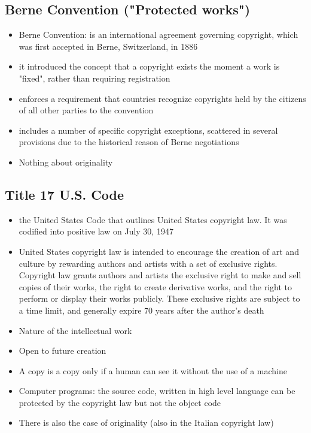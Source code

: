 \documentclass{article}
\begin{document}
\subsection{Berne Convention ("Protected works")}
\begin{itemize}
\item Berne Convention: is an international agreement governing copyright, which was first accepted in Berne, Switzerland, in 1886
\item it introduced the concept that a copyright exists the moment a work is "fixed", rather than requiring registration
\item enforces a requirement that countries recognize copyrights held by the citizens of all other parties to the convention
\item includes a number of specific copyright exceptions, scattered in several provisions due to the historical reason of Berne negotiations
\item Nothing about originality 
\end{itemize}

\subsection{Title 17 U.S. Code} 
\begin{itemize}
\item the United States Code that outlines United States copyright law. It was codified into positive law on July 30, 1947
\item United States copyright law is intended to encourage the creation of art and culture by rewarding authors and artists with a set of exclusive rights. Copyright law grants authors and artists the exclusive right to make and sell copies of their works, the right to create derivative works, and the right to perform or display their works publicly. These exclusive rights are subject to a time limit, and generally expire 70 years after the author's death
\item Nature of the intellectual work
\item Open to future creation 
\item A copy is a copy only if a human can see it without the use of a machine
\item Computer programs: the source code, written in high level language can be protected by the copyright law but not the object code 
\item There is also the case of originality  (also in the Italian copyright law)
\end{itemize}
\end{document}
